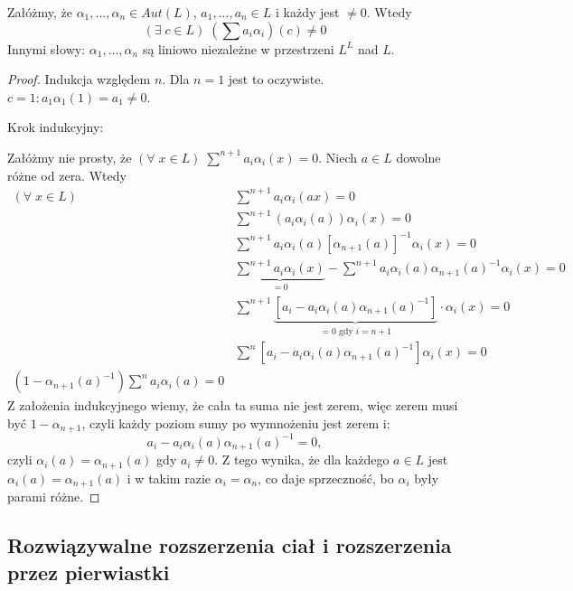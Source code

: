 \begin{theorem}\label{tw:9.5}
Załóżmy, że $\alpha_1,...,\alpha_n\in Aut(L)$, $a_1,...,a_n\in L$ i każdy jest $\neq0$. Wtedy 
$$(\exists\;c\in L)\;(\sum a_i\alpha_i)(c)\neq 0$$
Innymi słowy: $\alpha_1,...,\alpha_n$ są liniowo niezależne w przestrzeni $L^L$ nad $L$.
\end{theorem}
\begin{proof}
Indukcja względem $n$. Dla $n=1$ jest to oczywiste. $c=1:a_1\alpha_1(1)=a_1\neq 0$.

Krok indukcyjny:

Załóżmy nie prosty, że $(\forall\;x\in L)\;\sum^{n+1}a_i\alpha_i(x)=0$. Niech $a\in L$ dowolne różne od zera. Wtedy
\begin{align*}
(\forall\;x\in L)\;&\sum^{n+1}a_i\alpha_i(ax)=0\\
&\sum^{n+1}(a_i\alpha_i(a))\alpha_i(x)=0\\
&\sum^{n+1}a_i\alpha_i(a)[\alpha_{n+1}(a)]^{-1}\alpha_i(x)=0\\
&\underbrace{\sum^{n+1}a_i\alpha_i(x)}_{=0}-\sum^{n+1}a_i\alpha_i(a)\alpha_{n+1}(a)^{-1}\alpha_i(x)=0\\
&\sum^{n+1}\underbrace{\left[a_i-a_i\alpha_i(a)\alpha_{n+1}(a)^{-1}\right]}_{=0\text{ gdy }i=n+1}\cdot\alpha_i(x)=0\\
&\sum^n\left[a_i-a_i\alpha_i(a)\alpha_{n+1}(a)^{-1}\right]\alpha_i(x)=0\\
(1-\alpha_{n+1}(a)^{-1})\sum^n a_i\alpha_i(a)=0
\end{align*}
Z założenia indukcyjnego wiemy, że cała ta suma nie jest zerem, więc zerem musi być $1-\alpha_{n+1}$, czyli każdy poziom sumy po wymnożeniu jest zerem i:
$$a_i-a_i\alpha_i(a)\alpha_{n+1}(a)^{-1}=0,$$
czyli $\alpha_i(a)=\alpha_{n+1}(a)$ gdy $a_i\neq 0$. Z tego wynika, że dla każdego $a\in L$ jest $\alpha_i(a)=\alpha_{n+1}(a)$ i w takim razie $\alpha_i=\alpha_n$, co daje sprzeczność, bo $\alpha_i$ były parami różne.
\end{proof}

\subsection{Rozwiązywalne rozszerzenia ciał i rozszerzenia przez pierwiastki}

